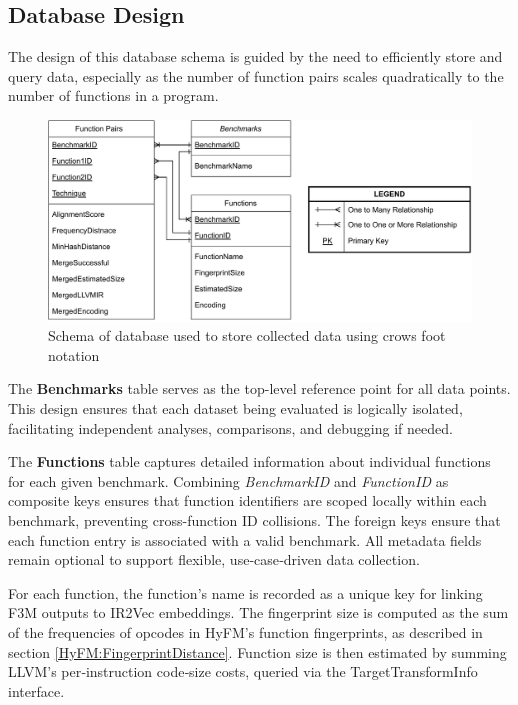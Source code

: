 \subsection{Database Design} \label{subsection:DatabaseSchema}
The design of this database schema is guided by the need to efficiently store and query data, especially as the number of function pairs scales quadratically to the number of functions in a program. 
\begin{figure}[tbh!]
\centering
\includegraphics[scale=0.85]{Figures/DataCollectionSchema.pdf}
\caption{Schema of database used to store collected data using crows foot notation}\label{fig:DatabaseSchema}
\end{figure}

The \textbf{Benchmarks} table serves as the top-level reference point for all data points. This design ensures that each dataset being evaluated is logically isolated, facilitating independent analyses, comparisons, and debugging if needed.

The \textbf{Functions} table captures detailed information about individual functions for each given benchmark. Combining \textit{BenchmarkID} and \textit{FunctionID} as composite keys ensures that function identifiers are scoped locally within each benchmark, preventing cross-function ID collisions. The foreign keys ensure that each function entry is associated with a valid benchmark. All metadata fields remain optional to support flexible, use‑case‑driven data collection.

For each function, the function's name is recorded as a unique key for linking F3M outputs to IR2Vec embeddings. The fingerprint size is computed as the sum of the frequencies of opcodes in HyFM's function fingerprints, as described in section \ref{HyFM:FingerprintDistance}. Function size is then estimated by summing LLVM’s per‑instruction code‑size costs, queried via the TargetTransformInfo interface.

